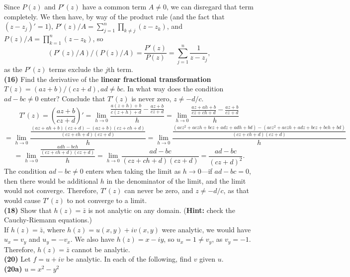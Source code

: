 \documentclass[12pt,letterpaper]{article}
\begin{document}
Since \(P(z)\) and \(P'(z)\) have a common term \(A \neq 0\), we can disregard that term completely. We then have, by way of the product rule (and the fact that \((z-z_{j})' = 1\)), \(P'(z)/A = \sum_{j=1}^{n} \prod_{k \neq j} (z-z_{k})\), and \(P(z)/A = \prod_{k=1}^{n} (z-z_{k})\), so \[(P'(z)/A)/(P(z)/A) = \frac{P'(z)}{P(z)} = \sum_{j=1}^{n} \frac{1}{z-z_{j}},\] as the \(P'(z)\) terms exclude the \(j\)th term. \\

\textbf{(16)} Find the derivative of the \textbf{linear fractional transformation} \(T(z) = (az+b)/(cz+d), ad \neq bc.\) In what way does the condition \(ad - bc \neq 0\) enter? Conclude that \(T'(z)\) is never zero, \(z \neq -d/c\). \\

\[T'(z) = \left( \frac{az+b}{cz+d} \right)' = \lim_{h \to 0} \frac{\frac{a(z+h) + b}{c(z+h) + d} - \frac{az+b}{cz+d}}{h} = \lim_{h \to 0} \frac{\frac{az+ah + b}{cz+ch + d} - \frac{az+b}{cz+d}}{h}\] \[= \lim_{h \to 0} \frac{\frac{(az+ah + b)(cz+d)-(az+b)(cz+ch+d)}{(cz+ch + d)(cz+d)}}{h} = \lim_{h \to 0} \frac{\frac{(acz^{2}+aczh + bcz + adz + adh + bd )-(acz^{2} + aczh + adz + bcz + bch + bd )}{(cz+ch + d)(cz+d)}}{h}\] \[= \lim_{h \to 0} \frac{\frac{adh-bch}{(cz+ch + d)(cz+d)}}{h} = \lim_{h \to 0} \frac{ad - bc}{(cz + ch + d)(cz+d)} = \frac{ad-bc}{(cz+d)^{2}}.\] The condition \(ad-bc \neq 0\) enters when taking the limit as \(h \to 0\)---if \(ad-bc = 0\), then there would be additional \(h\) in the denominator of the limit, and the limit would not converge. Therefore, \(T'(z)\) can never be zero, and \(z \neq -d/c\), as that would cause \(T'(z)\) to not converge to a limit. \\

\textbf{(18)} Show that \(h(z) = \bar{z}\) is not analytic on any domain. (\textbf{Hint:} check the Cauchy-Riemann equations.) \\

If \(h(z) = \bar{z}\), where \(h(z) = u(x,y) + iv(x,y)\) were analytic, we would have \(u_{x} = v_{y}\) and \(u_{y} = -v_{x}\). We also have \(h(z) = x - iy\), so \(u_{x} = 1 \neq v_{y}\), as \(v_{y} = -1\). Therefore, \(h(z) = \bar{z}\) cannot be analytic. \\

\textbf{(20)} Let \(f = u + iv\) be analytic. In each of the following, find \(v\) given \(u\). \\

\textbf{(20a)} \(u = x^{2} - y^{2}\) \\
\end{document}
